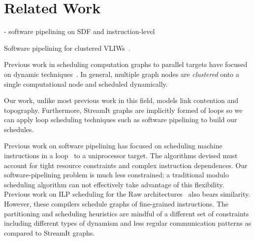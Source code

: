 \section{Related Work}
\label{sec:related}

- software pipelining on SDF and instruction-level

Software pipelining for clustered VLIWs~\cite{qian02}.

Previous work in scheduling computation graphs to parallel targets
have focused on dynamic techniques~\cite{SDFSched, SDFSched2,
may87communicating, DAGSched}. In general, multiple graph nodes are
{\it clustered} onto a single computational node and scheduled
dynamically.

Our work, unlike most previous work in this field, models link
contention and topography.  Furthermore, StreamIt graphs are
implicitly formed of loops so we can apply loop scheduling techniques
such as software pipelining to build our schedules.


Previous work on software pipelining has focused on scheduling machine
instructions in a loop~\cite{lam-softpipe, rau-softpipe} to a
uniprocessor target.  The algorithms devised must account for tight
resource constraints and complex instruction dependences.  Our
software-pipelining problem is much less constrained; a traditional
modulo scheduling algorithm can not effectively take advantage of this
flexibility.  Previous work on ILP scheduling for the Raw
architectures~\cite{lee98spacetime} also bears similarity.  However,
these compilers schedule graphs of fine-grained instructions. The
partitioning and scheduling heuristics are mindful of a different set
of constraints including different types of dynamism and less regular
communication patterns as compared to StreamIt graphs.


%

